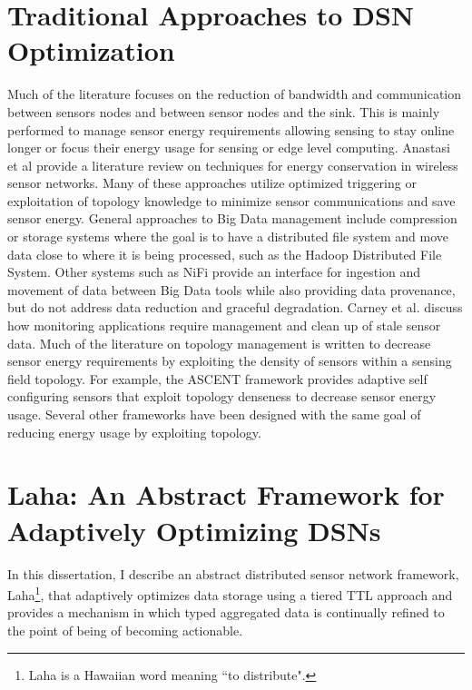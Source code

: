 \section{Traditional Approaches to DSN Optimization}\label{sec:traditional-approaches-to-dsn-optimization}
Much of the literature focuses on the reduction of bandwidth and communication between sensors nodes and between sensor nodes and the sink. This is mainly performed to manage sensor energy requirements allowing sensing to stay online longer or focus their energy usage for sensing or edge level computing. Anastasi et al\cite{anastasi_energy_2009} provide a literature review on techniques for energy conservation in wireless sensor networks. Many of these approaches utilize optimized triggering\cite{alippi_adaptive_2010} or exploitation of topology knowledge\cite{warrier2007much} to minimize sensor communications and save sensor energy.  General approaches to Big Data management include compression\cite{tang2004compression} or storage systems where the goal is to have a distributed file system and move data close to where it is being processed, such as the Hadoop Distributed File System\cite{warrier2007much}. Other systems such as NiFi\cite{hughes2016survey} provide an interface for ingestion and movement of data between Big Data tools while also providing data provenance, but do not address data reduction and graceful degradation. Carney et al.\cite{carney2002monitoring} discuss how monitoring applications require management and clean up of stale sensor data. Much of the literature on topology management is written to decrease sensor energy requirements by exploiting the density of sensors within a sensing field topology. For example, the ASCENT\cite{cerpa2004ascent} framework provides adaptive self configuring sensors that exploit topology denseness to decrease sensor energy usage. Several other frameworks have been designed with the same goal of reducing energy usage by exploiting topology\cite{schurgers2002stem,schurgers2002topology}.

\section{Laha: An Abstract Framework for Adaptively Optimizing DSNs}\label{sec:laha:-an-abstract-framework-for-adaptively-optimizing-dsns}
In this dissertation, I describe an abstract distributed sensor network framework, Laha\footnote{Laha is a Hawaiian word meaning ``to distribute".}, that adaptively optimizes data storage using a tiered TTL approach and provides a mechanism in which typed aggregated data is continually refined to the point of being of becoming actionable.

